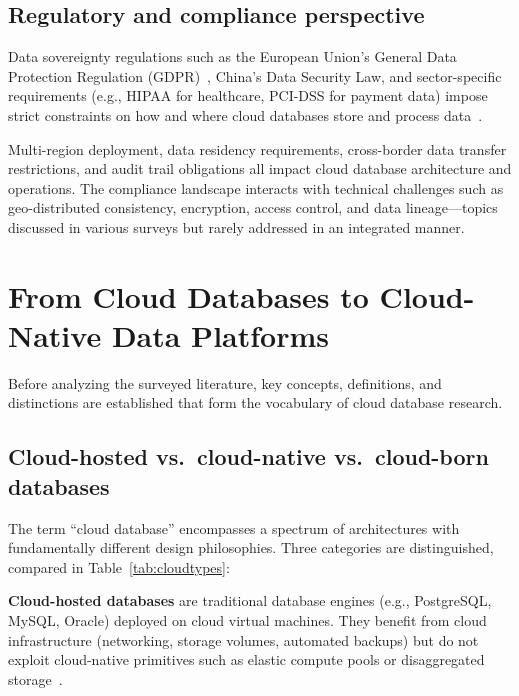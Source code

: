\documentclass[a4paper,fleqn]{cas-sc}
\begin{document}
\subsection{Regulatory and compliance perspective}
\label{subsec:regulatory}

Data sovereignty regulations such as the European Union's General Data Protection Regulation (GDPR)~\cite{GDPR2016}, China's Data Security Law, and sector-specific requirements (e.g., HIPAA for healthcare, PCI-DSS for payment data) impose strict constraints on how and where cloud databases store and process data~\cite{Politou2018GDPR}.

Multi-region deployment, data residency requirements, cross-border data transfer restrictions, and audit trail obligations all impact cloud database architecture and operations. The compliance landscape interacts with technical challenges such as geo-distributed consistency, encryption, access control, and data lineage---topics discussed in various surveys but rarely addressed in an integrated manner.


\section{From Cloud Databases to Cloud-Native Data Platforms}
\label{sec:concepts}

Before analyzing the surveyed literature, key concepts, definitions, and distinctions are established that form the vocabulary of cloud database research.

\subsection{Cloud-hosted vs.\ cloud-native vs.\ cloud-born databases}
\label{subsec:cloudtypes}

The term ``cloud database'' encompasses a spectrum of architectures with fundamentally different design philosophies. Three categories are distinguished, compared in Table~\ref{tab:cloudtypes}:


\textbf{Cloud-hosted databases} are traditional database engines (e.g., PostgreSQL, MySQL, Oracle) deployed on cloud virtual machines. They benefit from cloud infrastructure (networking, storage volumes, automated backups) but do not exploit cloud-native primitives such as elastic compute pools or disaggregated storage~\cite{Li2024CloudNativeSurvey}.
\end{document}
